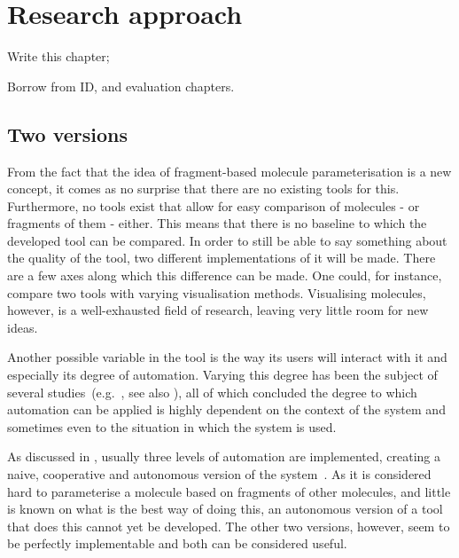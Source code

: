\chapter{Research approach}

\begin{todo}
\item Write this chapter;
\item Borrow from ID, and evaluation chapters.
\end{todo}

\nlipsum



\section{Two versions}
From the fact that the idea of fragment-based molecule parameterisation is a new concept, it comes as no surprise that there are no existing tools for this. Furthermore, no tools exist that allow for easy comparison of molecules - or fragments of them - either. This means that there is no baseline to which the developed tool can be compared. In order to still be able to say something about the quality of the tool, two different implementations of it will be made. There are a few axes along which this difference can be made. One could, for instance, compare two tools with varying visualisation methods. Visualising molecules, however, is a well-exhausted field of research, leaving very little room for new ideas.

Another possible variable in the tool is the way its users will interact with it and especially its degree of automation. Varying this degree has been the subject of several studies~(e.g.~\cite{payne2000varying, horvitz1999principles, marcus1987taking, norman1990problem}, see also ), all of which concluded the degree to which automation can be applied is highly dependent on the context of the system and sometimes even to the situation in which the system is used.

As discussed in , usually three levels of automation are implemented, creating a naive, cooperative and autonomous version of the system~\cite{payne2000varying}. As it is considered hard to parameterise a molecule based on fragments of other molecules, and little is known on what is the best way of doing this, an autonomous version of a tool that does this cannot yet be developed. The other two versions, however, seem to be perfectly implementable and both can be considered useful.



